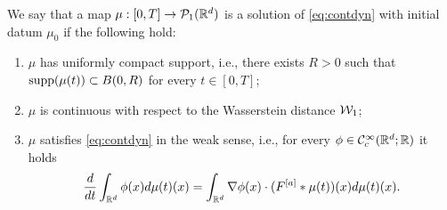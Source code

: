 \begin{definition}
We say that a map $\mu:[0,T]\rightarrow\mathcal{P}_1(\mathbb{R}^d)$ is a solution of \eqref{eq:contdyn} with initial datum $\mu_0$ if the following hold:
\begin{enumerate}
\item $\mu$ has uniformly compact support, i.e., there exists $R > 0$ such that $\operatorname{supp}(\mu(t)) \subset B(0,R)$ for every $t \in [0,T]$;
\item $\mu$ is continuous with respect to the Wasserstein distance $\mathcal{W}_1$;
\item $\mu$ satisfies \eqref{eq:contdyn} in the weak sense, i.e., for every $\phi \in \mathcal{C}^{\infty}_c(\mathbb{R}^d;\mathbb{R})$ it holds
\begin{align*}
\frac{d}{dt} \int_{\mathbb{R}^d} \phi(x) d\mu(t)(x) = \int_{\mathbb{R}^d} \nabla \phi(x) \cdot (F^{[a]}*\mu(t))(x) d\mu(t)(x).
\end{align*}
\end{enumerate}
\end{definition}

